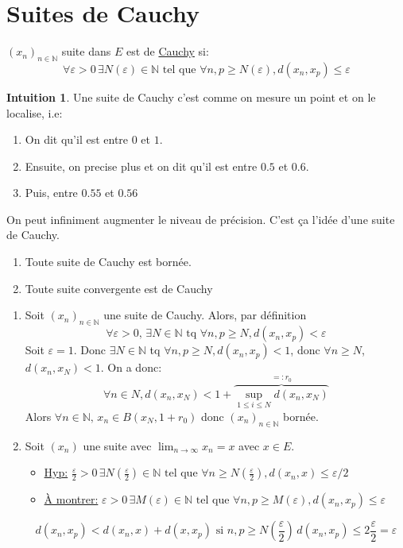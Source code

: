 \documentclass[a4paper]{report}
\newcommand\N{\ensuremath{\mathbb{N}}}
\let\epsilon\varepsilon
\theoremstyle{definition}
\newtheorem*{intuition}{Intuition}
\begin{document}
\section{Suites de Cauchy}
\begin{definition}
    $(x_n)_{n \in \N}$ suite dans $E$ est de \underline{Cauchy} si:
     \[
    \forall \epsilon > 0 \, \exists N(\epsilon) \in \N \text{ tel que } \forall n, p \ge N(\epsilon), d(x_n, x_p) \le \epsilon
    \] 
\end{definition}
\begin{intuition}
   Une suite de Cauchy c'est comme on mesure un point et on le localise, i.e:
   \begin{enumerate}
       \item On dit qu'il est entre $0$ et  $1$.
       \item Ensuite, on precise plus et on dit qu'il est entre  $0.5$ et  $0.6$.
       \item Puis, entre  $0.55$ et  $0.56$
   \end{enumerate}
   On peut infiniment augmenter le niveau de précision. C'est ça l'idée d'une suite de Cauchy.
\end{intuition}
\begin{prop}
   \begin{enumerate}
       \item Toute suite de Cauchy est bornée.
        \item Toute suite convergente est de Cauchy
   \end{enumerate} 
\end{prop}
\begin{preuve}
   \begin{enumerate}
       \item Soit $(x_n)_{n \in \N}$ une suite de Cauchy. Alors, par définition
           \[
           \forall \varepsilon > 0, \, \exists N \in \N \text{ tq } \forall n, p \ge N, d(x_n, x_p) < \varepsilon
           \] 
           Soit $\varepsilon = 1$. Donc  $\exists N \in \N$ tq $\forall n, p \ge N, d(x_n, x_p) < 1$, donc $\forall n \ge N$, $d(x_n, x_N) < 1$. On a donc:
           \[
               \forall n \in  N, d(x_n, x_N) < 1 + \overbrace{\sup_{1 \le i \le N}d(x_n, x_N)}^{=: r_0}
           \] 
           Alors $\forall n \in \N, \, x_n \in B(x_N, 1 + r_0)$ donc $(x_n)_{n \in \N}$ bornée.
       \item Soit $(x_n)$ une suite avec  $\lim_{n \to \infty} x_n = x$ avec $x \in E$.
           \begin{itemize}
               \item 
                   \underline{Hyp:}  $\frac{\epsilon}{2} > 0 \, \exists N(\frac{\epsilon}{2}) \in \N \text{ tel que } \forall n \ge N(\frac{\epsilon}{2}), d(x_n, x) \le \epsilon/2$
                \item 
                    \underline{À montrer:} $\epsilon > 0 \, \exists M(\epsilon) \in \N \text{ tel que } \forall n, p \ge M(\epsilon), d(x_n, x_p) \le \epsilon$
           \end{itemize}
           \[
               d(x_n, x_p) < d(x_n, x) + d(x, x_p) \text{ si } n, p \ge  N(\frac{\epsilon}{2}) \, d(x_n, x_p) \le 2 \frac{\epsilon}{2} = \epsilon
           \] 
   \end{enumerate} 
\end{preuve}
\end{document}
